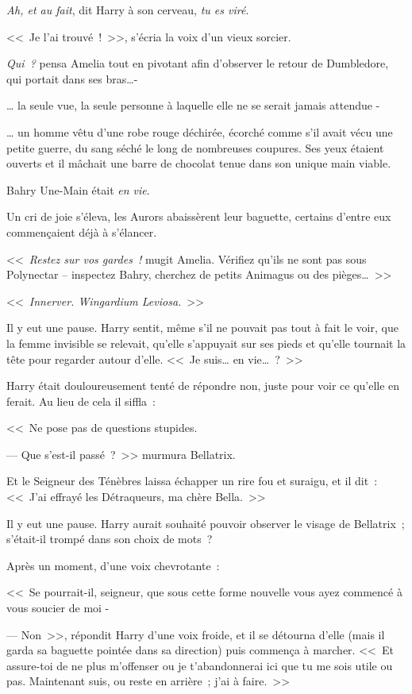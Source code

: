 \emph{Ah, et au fait}, dit Harry à son cerveau, \emph{tu es viré}.

\later

<<~Je l'ai trouvé~!~>>, s'écria la voix d'un vieux sorcier.

\emph{Qui~?} pensa Amelia tout en pivotant afin d'observer le retour de Dumbledore, qui portait dans ses bras…-

… la seule vue, la seule personne à laquelle elle ne se serait jamais attendue -

… un homme vêtu d'une robe rouge déchirée, écorché comme s'il avait vécu une petite guerre, du sang séché le long de nombreuses coupures. Ses yeux étaient ouverts et il mâchait une barre de chocolat tenue dans son unique main viable.

Bahry Une-Main était \emph{en vie}.

Un cri de joie s'éleva, les Aurors abaissèrent leur baguette, certains d'entre eux commençaient déjà à s'élancer.

<<~\emph{Restez sur vos gardes~!} mugit Amelia. Vérifiez qu'ils ne sont pas sous Polynectar -- inspectez Bahry, cherchez de petits Animagus ou des pièges…~>>

\later

<<~\emph{Innerver. Wingardium Leviosa.}~>>

Il y eut une pause. Harry sentit, même s'il ne pouvait pas tout à fait le voir, que la femme invisible se relevait, qu'elle s'appuyait sur ses pieds et qu'elle tournait la tête pour regarder autour d'elle. <<~Je suis… en vie…~?~>>

Harry était douloureusement tenté de répondre non, juste pour voir ce qu'elle en ferait. Au lieu de cela il siffla~:

<<~Ne pose pas de questions stupides.

--- Que s'est-il passé~?~>> murmura Bellatrix.

Et le Seigneur des Ténèbres laissa échapper un rire fou et suraigu, et il dit~: <<~J'ai effrayé les Détraqueurs, ma chère Bella.~>>

Il y eut une pause. Harry aurait souhaité pouvoir observer le visage de Bellatrix~; s'était-il trompé dans son choix de mots~?

Après un moment, d'une voix chevrotante~:

<<~Se pourrait-il, seigneur, que sous cette forme nouvelle vous ayez commencé à vous soucier de moi -

--- Non~>>, répondit Harry d'une voix froide, et il se détourna d'elle (mais il garda sa baguette pointée dans sa direction) puis commença à marcher. <<~Et assure-toi de ne plus m'offenser ou je t'abandonnerai ici que tu me sois utile ou pas. Maintenant suis, ou reste en arrière~; j'ai à faire.~>>

